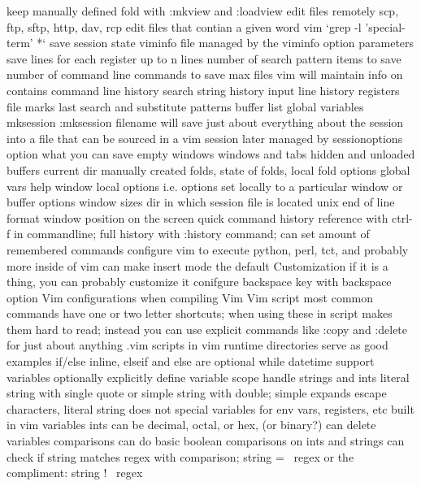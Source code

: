 \documentclass[12pt]{book}
\begin{document}
{{    keep manually defined fold with :mkview and :loadview
  edit files remotely
    scp, ftp, sftp, http, dav, rcp
  edit files that contian a given word
    vim `grep -l 'special-term' *`
  save session state
    viminfo file
      managed by the viminfo option parameters
        save lines for each register up to n lines
        number of search pattern items to save
        number of command line commands to save
        max files vim will maintain info on
      contains
        command line history
        search string history
        input line history
        registers
        file marks
        last search and substitute patterns
        buffer list
        global variables
    mksession
      :mksession filename will save just about everything about the session into a file that can be sourced in a vim session later
      managed by sessionoptions option
      what you can save
        empty windows
        windows and tabs
        hidden and unloaded buffers
        current dir
        manually created folds, state of folds, local fold options
        global vars
        help window
        local options i.e. options set locally to a particular window or buffer
        options
        window sizes
        dir in which session file is located
        unix end of line format
        window position on the screen
  quick command history reference with ctrl-f in commandline; full history with :history command; can set amount of remembered commands
  configure vim to execute python, perl, tct, and probably more inside of vim
  can make insert mode the default
Customization
  if it is a thing, you can probably customize it
  conifgure backspace key with backspace option
  Vim configurations when compiling Vim
  Vim script
    most common commands have one or two letter shortcuts; when using these in script makes them hard to read; instead you can use explicit commands like :copy and :delete for just about anything
    .vim scripts in vim runtime directories serve as good examples
    if/else
      inline, elseif and else are optional
    while
    datetime support
    variables
      optionally explicitly define variable scope
      handle strings and ints
      literal string with single quote or simple string with double; simple expands escape characters, literal string does not
      special variables for env vars, registers, etc
      built in vim variables
      ints can be decimal, octal, or hex, (or binary?)
      can delete variables
    comparisons
      can do basic boolean comparisons on ints and strings
      can check if string matches regex with comparison; string =~ regex or the compliment: string !~ regex
}}
\end{document}
